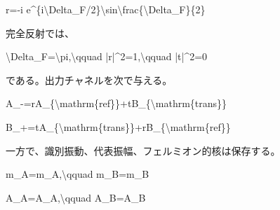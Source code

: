\documentclass[
  a4paper,
]{article}
\newenvironment{Shaded}{}{}
\newcommand{\NormalTok}[1]{#1}
\begin{document}
\begin{Shaded}
\begin{Highlighting}[]
\NormalTok{r={-}i e\^{}\{i\textbackslash{}Delta\_F/2\}\textbackslash{}sin\textbackslash{}frac\{\textbackslash{}Delta\_F\}\{2\}}
\end{Highlighting}
\end{Shaded}

完全反射では、

\begin{Shaded}
\begin{Highlighting}[]
\NormalTok{\textbackslash{}Delta\_F=\textbackslash{}pi,\textbackslash{}qquad |r|\^{}2=1,\textbackslash{}qquad |t|\^{}2=0}
\end{Highlighting}
\end{Shaded}

である。出力チャネルを次で与える。

\begin{Shaded}
\begin{Highlighting}[]
\NormalTok{A\_{-}\textquotesingle{}\textquotesingle{}=rA\_\{\textbackslash{}mathrm\{ref\}\}\textquotesingle{}+tB\_\{\textbackslash{}mathrm\{trans\}\}\textquotesingle{}}
\end{Highlighting}
\end{Shaded}

\begin{Shaded}
\begin{Highlighting}[]
\NormalTok{B\_+\textquotesingle{}\textquotesingle{}=tA\_\{\textbackslash{}mathrm\{trans\}\}\textquotesingle{}+rB\_\{\textbackslash{}mathrm\{ref\}\}\textquotesingle{}}
\end{Highlighting}
\end{Shaded}

一方で、識別振動、代表振幅、フェルミオン的核は保存する。

\begin{Shaded}
\begin{Highlighting}[]
\NormalTok{m\_A\textquotesingle{}\textquotesingle{}=m\_A\textquotesingle{},\textbackslash{}qquad m\_B\textquotesingle{}\textquotesingle{}=m\_B\textquotesingle{}}
\end{Highlighting}
\end{Shaded}

\begin{Shaded}
\begin{Highlighting}[]
\NormalTok{A\_A\textquotesingle{}\textquotesingle{}=A\_A\textquotesingle{},\textbackslash{}qquad A\_B\textquotesingle{}\textquotesingle{}=A\_B\textquotesingle{}}
\end{Highlighting}
\end{Shaded}
\end{document}
